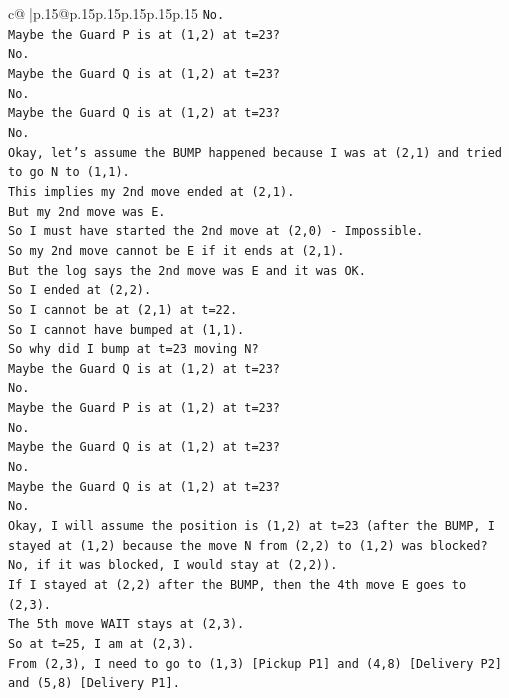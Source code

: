 \documentclass{article}
\begin{document}
{\begin{supertabular}{c@{$\;$}|p{.15\linewidth}@{}p{.15\linewidth}p{.15\linewidth}p{.15\linewidth}p{.15\linewidth}p{.15\linewidth}}
{{{\texttt{No.} \\
\texttt{Maybe the Guard P is at (1,2) at t=23?} \\
\texttt{No.} \\
\texttt{Maybe the Guard Q is at (1,2) at t=23?} \\
\texttt{No.} \\
\texttt{Maybe the Guard Q is at (1,2) at t=23?} \\
\texttt{No.} \\
\texttt{Okay, let's assume the BUMP happened because I was at (2,1) and tried to go N to (1,1).} \\
\texttt{This implies my 2nd move ended at (2,1).} \\
\texttt{But my 2nd move was E.} \\
\texttt{So I must have started the 2nd move at (2,0) {-} Impossible.} \\
\texttt{So my 2nd move cannot be E if it ends at (2,1).} \\
\texttt{But the log says the 2nd move was E and it was OK.} \\
\texttt{So I ended at (2,2).} \\
\texttt{So I cannot be at (2,1) at t=22.} \\
\texttt{So I cannot have bumped at (1,1).} \\
\texttt{So why did I bump at t=23 moving N?} \\
\texttt{Maybe the Guard Q is at (1,2) at t=23?} \\
\texttt{No.} \\
\texttt{Maybe the Guard P is at (1,2) at t=23?} \\
\texttt{No.} \\
\texttt{Maybe the Guard Q is at (1,2) at t=23?} \\
\texttt{No.} \\
\texttt{Maybe the Guard Q is at (1,2) at t=23?} \\
\texttt{No.} \\
\texttt{Okay, I will assume the position is (1,2) at t=23 (after the BUMP, I stayed at (1,2) because the move N from (2,2) to (1,2) was blocked? No, if it was blocked, I would stay at (2,2)).} \\
\texttt{If I stayed at (2,2) after the BUMP, then the 4th move E goes to (2,3).} \\
\texttt{The 5th move WAIT stays at (2,3).} \\
\texttt{So at t=25, I am at (2,3).} \\
\texttt{From (2,3), I need to go to (1,3) {[}Pickup P1{]} and (4,8) {[}Delivery P2{]} and (5,8) {[}Delivery P1{]}.} \\
}}}
\end{supertabular}}
\end{document}
